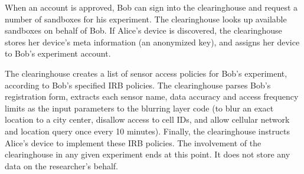  When an account is approved, Bob 
can sign into the clearinghouse and request a 
number of sandboxes for his experiment. The clearinghouse 
looks up available sandboxes on behalf of Bob. If Alice's device is discovered, the 
clearinghouse stores her device's meta information (an anonymized 
key), %
and assigns her device to Bob's experiment account. 

The clearinghouse creates a list of sensor access policies for Bob's
experiment, according to Bob's specified IRB policies. The 
clearinghouse parses Bob's registration form, extracts each sensor name, 
data accuracy and access frequency limits as the 
input parameters to the blurring layer code (to blur an exact location 
to a city center, disallow access to cell IDs, and allow cellular network and 
location query once every 10 minutes). Finally, the clearinghouse 
instructs Alice's device to implement these IRB policies. The involvement 
of the clearinghouse in any given experiment ends at this point.
It does not store any data on the researcher's behalf. 



%


